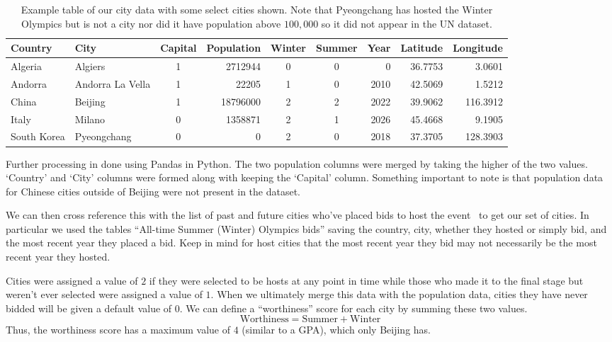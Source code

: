 \documentclass[
 reprint,
 amsmath,amssymb,
 aps,
prb,
floatfix
]{revtex4-2}
\begin{document}
    \begin{table}[tb]
        \centering
        \begin{tabular}{ll|cr|ccr|rr}
        Country & City & Capital & Population & Winter & Summer & Year & Latitude & Longitude \\
        \hline\hline
        Algeria&Algiers&1&2712944&0&0&0&36.7753&3.0601\\
        Andorra&Andorra La Vella&1&22205&1&0&2010&42.5069&1.5212\\
        China&Beijing&1&18796000&2&2&2022&39.9062&116.3912\\
        Italy&Milano&0&1358871&2&1&2026&45.4668&9.1905\\
        South Korea&Pyeongchang&0&0&2&0&2018&37.3705&128.3903
        \end{tabular}
        \caption{Example table of our city data with some select cities shown. Note that Pyeongchang has hosted the Winter Olympics but is not a city nor did it have population above $100,000$ so it did not appear in the UN dataset.}
        \label{table_locData}
    \end{table}
    Further processing in done using Pandas in Python. The two population columns were merged by taking the higher of the two values. `Country' and `City' columns were formed along with keeping the `Capital' column. Something important to note is that population data for Chinese cities outside of Beijing were not present in the dataset.

    We can then cross reference this with the list of past and future cities who've placed bids to host the event~\cite{wiki_hosts} to get our set of cities. In particular we used the tables ``All-time Summer (Winter) Olympics bids'' saving the country, city, whether they hosted or simply bid, and the most recent year they placed a bid. Keep in mind for host cities that the most recent year they bid may not necessarily be the most recent year they hosted.

    Cities were assigned a value of $2$ if they were selected to be hosts at any point in time while those who made it to the final stage but weren't ever selected were assigned a value of $1$. When we ultimately merge this data with the population data, cities they have never bidded will be given a default value of $0$. We can define a ``worthiness'' score for each city by summing these two values.
    \begin{equation*}
        \textrm{Worthiness} = \textrm{Summer} + \textrm{Winter}
    \end{equation*}
    Thus, the worthiness score has a maximum value of $4$ (similar to a GPA), which only Beijing has.
\end{document}

